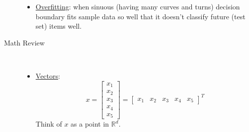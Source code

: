 \documentclass[10pt]{article}
\begin{document}
\begin{description}
\begin{itemize}
			\item \underline{Overfitting}: when sinuous (having many curves and turns) decision boundary fits sample data so well that it doesn't classify future (test set) items well.
		\end{itemize}
		
	\item[Math Review]
		\
		\begin{itemize}
			\item \underline{Vectors}:
			$$
				x = \begin{bmatrix}
 					x_{1} \\
 					x_{2} \\
 					x_{3} \\
 					x_{4} \\
 					x_{5} 
 				\end{bmatrix}
 				= \begin{bmatrix}
 					x_{1} & x_{2} & x_{3} & x_{4} & x_{5}
 				\end{bmatrix}^{T}
			$$
			Think of $x$ as a point in $\mathbb{R}^{d}$.
			

\end{itemize}
\end{description}
\end{document}
